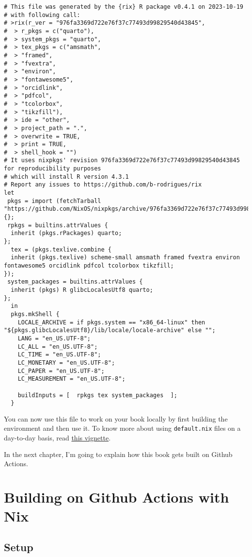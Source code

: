 \documentclass[
  letterpaper,
  paper=6in:9in,
  pagesize=pdftex,
  headinclude=on,
  footinclude=on,
  12pt]{scrbook}
\begin{document}
\begin{verbatim}
# This file was generated by the {rix} R package v0.4.1 on 2023-10-19
# with following call:
# >rix(r_ver = "976fa3369d722e76f37c77493d99829540d43845",
#  > r_pkgs = c("quarto"),
#  > system_pkgs = "quarto",
#  > tex_pkgs = c("amsmath",
#  > "framed",
#  > "fvextra",
#  > "environ",
#  > "fontawesome5",
#  > "orcidlink",
#  > "pdfcol",
#  > "tcolorbox",
#  > "tikzfill"),
#  > ide = "other",
#  > project_path = ".",
#  > overwrite = TRUE,
#  > print = TRUE,
#  > shell_hook = "")
# It uses nixpkgs' revision 976fa3369d722e76f37c77493d99829540d43845 for reproducibility purposes
# which will install R version 4.3.1
# Report any issues to https://github.com/b-rodrigues/rix
let
 pkgs = import (fetchTarball "https://github.com/NixOS/nixpkgs/archive/976fa3369d722e76f37c77493d99829540d43845.tar.gz") {};
 rpkgs = builtins.attrValues {
  inherit (pkgs.rPackages) quarto;
};
  tex = (pkgs.texlive.combine {
  inherit (pkgs.texlive) scheme-small amsmath framed fvextra environ fontawesome5 orcidlink pdfcol tcolorbox tikzfill;
});
 system_packages = builtins.attrValues {
  inherit (pkgs) R glibcLocalesUtf8 quarto;
};
  in
  pkgs.mkShell {
    LOCALE_ARCHIVE = if pkgs.system == "x86_64-linux" then  "${pkgs.glibcLocalesUtf8}/lib/locale/locale-archive" else "";
    LANG = "en_US.UTF-8";
    LC_ALL = "en_US.UTF-8";
    LC_TIME = "en_US.UTF-8";
    LC_MONETARY = "en_US.UTF-8";
    LC_PAPER = "en_US.UTF-8";
    LC_MEASUREMENT = "en_US.UTF-8";

    buildInputs = [  rpkgs tex system_packages  ];
  }
\end{verbatim}

You can now use this file to work on your book locally by first building
the environment and then use it. To know more about using
\texttt{default.nix} files on a day-to-day basis, read
\href{https://b-rodrigues.github.io/rix/articles/building-reproducible-development-environments-with-rix.html}{this
vignette}.

In the next chapter, I'm going to explain how this book gets built on
Github Actions.


\chapter{Building on Github Actions with
Nix}\label{building-on-github-actions-with-nix}

\section{Setup}\label{setup}
\end{document}
